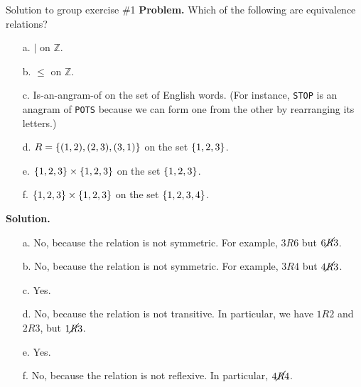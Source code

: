 \documentclass[10pt]{beamer}
\begin{document}
\begin{frame}{Solution to group exercise \#1}
\footnotesize 
\textbf{Problem.} Which of the following are equivalence relations?
	\begin{itemize} \footnotesize 
	\item[a.] $|$ on $\mathbb{Z}$.
	\item[b.] $\leq$ on $\mathbb{Z}$.
	\item[c.] Is-an-angram-of on the set of English words. (For instance, \texttt{STOP} is an anagram of \texttt{POTS} because we can form one from the other by rearranging its letters.)
	\item[d.] $R=\{ {(1,2),(2,3),(3,1)} \}$ on the set $\{ {1,2,3} \}$.
	\item[e.] $\{ {1,2,3} \} \times \{ {1,2,3} \}$ on the set $\{ {1,2,3} \}$.
	\item[f.] $\{ {1,2,3} \} \times \{ {1,2,3} \}$ on the set $\{ {1,2,3,4} \}$.
	\end{itemize}
	\vfill 
\textbf{Solution.}
	\begin{itemize} \footnotesize 
	\item[a.] No, because the relation is not symmetric.  For example, $3R6$ but $6\cancel{R}3$. 
	\item[b.] No, because the relation is not symmetric. For example, $3R4$ but $4\cancel{R}3$. 
	\item[c.] Yes. 
	\item[d.] No, because the relation is not transitive.  In particular, we have $1R2$ and $2R3$, but $1 \cancel{R} 3$.  %
	\item[e.] Yes. 
	\item[f.] No, because the relation is not reflexive. In particular, $4 \cancel{R} 4$. 
	\end{itemize}
	
\end{frame}
\end{document}

